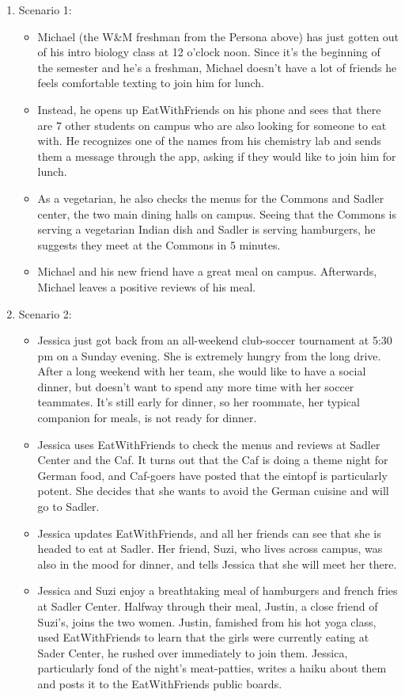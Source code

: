 \documentclass[5pt]{article} %
\begin{document}
\begin{enumerate}
\item Scenario 1:
\begin{itemize}
\item Michael (the W\&M freshman from the Persona above) has just gotten out of his intro biology class at 12 o’clock noon.  Since it’s the beginning of the semester and he’s a freshman, Michael doesn’t have a lot of friends he feels comfortable texting to join him for lunch.  
\item Instead, he opens up EatWithFriends on his phone and sees that there are 7 other students on campus who are also looking for someone to eat with.  He recognizes one of the names from his chemistry lab and sends them a message through the app, asking if they would like to join him for lunch.  
\item As a vegetarian, he also checks the menus for the Commons and Sadler center, the two main dining halls on campus.  Seeing that the Commons is serving a vegetarian Indian dish and Sadler is serving hamburgers, he suggests they meet at the Commons in 5 minutes.  
\item Michael and his new friend have a great meal on campus.  Afterwards, Michael leaves a positive reviews of his meal.  
\end{itemize}
\item Scenario 2:
\begin{itemize}
\item Jessica just got back from an all-weekend club-soccer tournament at 5:30 pm on a Sunday evening. She is extremely hungry from the long drive. After a long weekend with her team, she would like to have a social dinner, but doesn’t want to spend any more time with her soccer teammates. It’s still early for dinner, so her roommate, her typical companion for meals, is not ready for dinner. 
\item Jessica uses EatWithFriends to check the menus and reviews at Sadler Center and the Caf. It turns out that the Caf is doing a theme night for German food, and Caf-goers have posted that the eintopf is particularly potent. She decides that she wants to avoid the German cuisine and will go to Sadler.
\item Jessica updates EatWithFriends, and all her friends can see that she is headed to eat at Sadler. Her friend, Suzi, who lives across campus, was also in the mood for dinner, and tells Jessica that she will meet her there. 
\item Jessica and Suzi enjoy a breathtaking meal of hamburgers and french fries at Sadler Center. Halfway through their meal, Justin, a close friend of Suzi’s, joins the two women. Justin, famished from his hot yoga class, used EatWithFriends to learn that the girls were currently eating at Sader Center, he rushed over immediately to join them. Jessica, particularly fond of the night’s meat-patties, writes a haiku about them and posts it to the EatWithFriends public boards. 
\end{itemize}
\end{enumerate}
\end{document}
